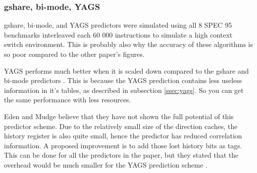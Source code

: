\subsubsection*{gshare, bi-mode, YAGS}
gshare, bi-mode, and YAGS predictors were simulated using all 8 SPEC 95 benchmarks interleaved each 60 000 instructions to simulate a high context switch environment.
This is probably also why the accuracy of these algorithms is so poor compared to the other paper's figures.

YAGS performs much better when it is scaled down compared to the gshare and bi-mode predictors \cite{yags}.
This is because the YAGS prediction contains less useless information in it's tables, as described in subsection \ref{ssec:yags}.
So you can get the same performance with less resources.

Eden and Mudge believe that they have not shown the full potential of this predictor scheme.
Due to the relatively small size of the direction caches, the history register is also quite small, hence the predictor has reduced correlation information.
A proposed improvement is to add those lost history bits as tags.
This can be done for all the predictors in the paper, but they stated that the overhead would be much smaller for the YAGS prediction scheme \cite{yags}. 
